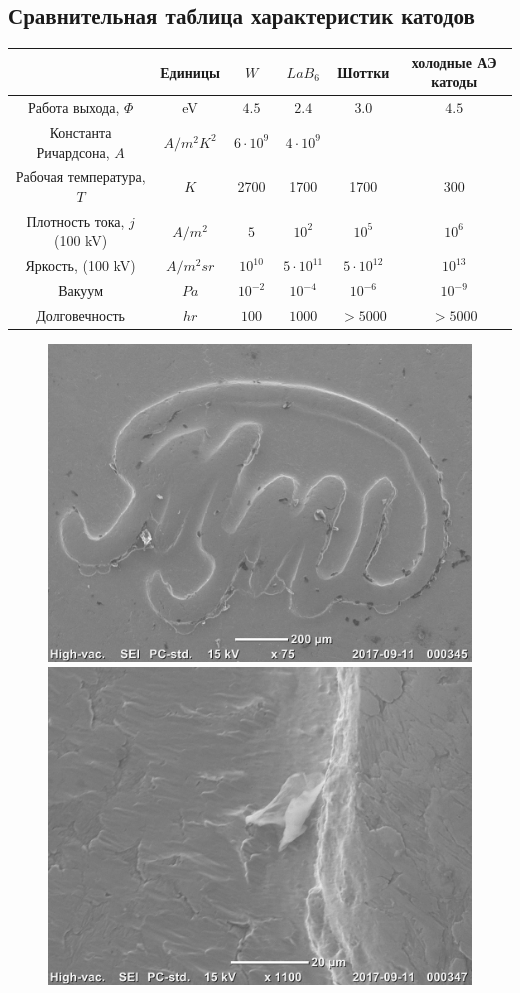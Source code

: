 \documentclass[12pt]{article}
\begin{document}
\subsection*{Сравнительная таблица характеристик катодов}

\begin{table}[!ht]
\centering
\begin{tabular}{cccccc}
& Единицы & $W$ & $LaB_6$ & Шоттки & холодные АЭ катоды \\
\hline
Работа выхода, $\Phi$ & eV & $4.5$ & $2.4$ & $3.0$ & $4.5$ \\
Константа Ричардсона, $A$ & $A / m^2 K^2$ & $6 \cdot 10^{9}$ & $4 \cdot 10^{9}$ & & \\
Рабочая температура, $T$ & $K$ & 2700 & 1700 & 1700 & 300 \\
Плотность тока, $j$ (100 kV) & $A / m^2$ & $5$ & $10^{2}$ & $10^{5}$ & $10^{6}$ \\
Яркость, (100 kV) & $A/m^2 sr$ & $10^{10}$ & $5 \cdot 10^{11}$ & $5 \cdot 10^{12}$ & $10^{13}$ \\
Вакуум & $Pa$ & $10^{-2}$ & $10^{-4}$ & $10^{-6}$ & $10^{-9}$ \\
Долговечность & $hr$ & $100$ & $1000$ & $>5000$ & $>5000$ \\
\hline
\end{tabular}
\end{table}

\begin{figure}[ht]
\includegraphics[width=0.5\linewidth]{pictures/20170911_000345.jpg}
\includegraphics[width=0.5\linewidth]{pictures/20170911_000347.jpg}
\end{figure}
\end{document}

